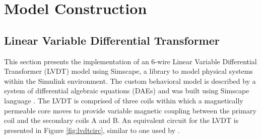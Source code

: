 \documentclass[conference]{IEEEtran}
\begin{document}


\section{Model Construction}

\subsection{Linear Variable Differential Transformer}

This section presents the implementation of an 6-wire Linear Variable Differential Transformer (LVDT) model using Simscape, a library to model physical systems within the Simulink environment. The custom behavioral model is described by a system of differential algebraic equations (DAEs) and was built using Simscape language \cite{mathworks}. The LVDT is comprised of three coils within which a magnetically permeable core moves to provide variable magnetic coupling between the primary coil and the secondary coils A and B. An equivalent circuit for the LVDT is presented in Figure \ref{fig:lvdtcirc}, similar to one used by \cite{rogeriodias}.
\end{document}
